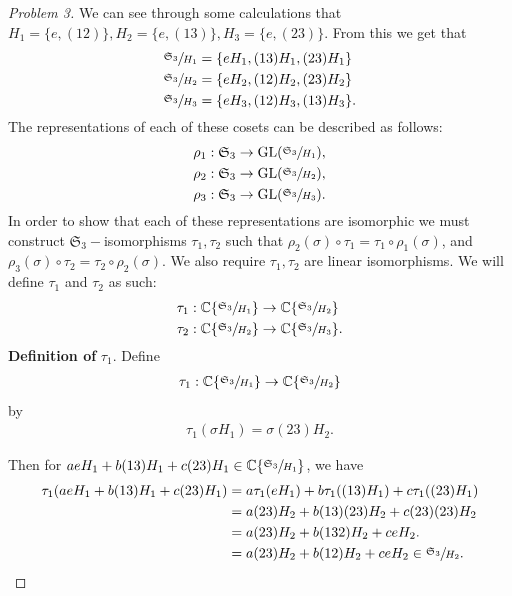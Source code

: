 \documentclass[titlepage]{article}
\theoremstyle{plain}
\theoremstyle{definition}
\theoremstyle{remark}
\theoremstyle{exercise-style}
\numberwithin{equation}{section}
\numberwithin{theorem}{section}
\numberwithin{remark}{section}
\begin{document}
\begin{proof}[Problem 3]
    We can see through some calculations that $H_1 = \{ e, (12) \}, H_2 = \{ e ,(13) \}, H_3 = \{ e, (23) \}$. From this we get that
    \begin{align}
        \sfrac{\mathfrak{S}_3}{H_1} &= \{ eH_1, (13)H_1, (23)H_1 \} \\
        \sfrac{\mathfrak{S}_3}{H_2} &= \{ eH_2, (12)H_2, (23)H_2 \} \\
        \sfrac{\mathfrak{S}_3}{H_3} &= \{ eH_3, (12)H_3, (13)H_3 \}.
    \end{align}
    The representations of each of these cosets can be described as follows:
    \begin{align}
        \rho_1 : \mathfrak{S}_3 &\to \mathrm{GL}(\sfrac{\mathfrak{S}_3}{H_1}), \\
        \rho_2 : \mathfrak{S}_3 &\to \mathrm{GL}(\sfrac{\mathfrak{S}_3}{H_2}), \\
        \rho_3 : \mathfrak{S}_3 &\to \mathrm{GL}(\sfrac{\mathfrak{S}_3}{H_3}).
    \end{align}
    In order to show that each of these representations are isomorphic we must construct $\mathfrak{S}_3-$isomorphisms $\tau_1, \tau_2$ such that $\rho_2(\sigma)\circ \tau_1 = \tau_1 \circ \rho_1(\sigma)$, and $\rho_3(\sigma) \circ \tau_2 = \tau_2 \circ \rho_2(\sigma)$. We also require $\tau_1, \tau_2$ are linear isomorphisms.
    We will define $\tau_1$ and $\tau_2$ as such:
    \begin{align}
        \tau_1: \mathbb{C}\{ \sfrac{\mathfrak{S}_3}{H_1} \} &\to \mathbb{C} \{ \sfrac{\mathfrak{S}_3}{H_2} \} \\
        \tau_2 : \mathbb{C}\{ \sfrac{\mathfrak{S}_3}{H_2} \}&\to \mathbb{C}\{ \sfrac{\mathfrak{S}_3}{H_3} \}.
    \end{align}
    \textbf{Definition of } $\tau_1$.
    Define
    \begin{align}
        \tau_1 : \mathbb{C}\{ \sfrac{\mathfrak{S}_3}{H_1} \} \to \mathbb{C}\{ \sfrac{\mathfrak{S}_3}{H_2} \}
    \end{align}
    by
    \begin{align}
        \tau_1(\sigma H_1) = \sigma (23)H_2.
    \end{align}
    
    Then for $a eH_1 + b(13)H_1 + c(23)H_1 \in \mathbb{C}\{ \sfrac{\mathfrak{S}_3}{H_1} \}$, we have
    \begin{align}
        \tau_1(a eH_1 + b(13)H_1 + c(23)H_1)
        &= a\tau_1(eH_1) + b\tau_1((13)H_1) + c\tau_1((23)H_1) \\
        &= a(23)H_2 + b(13)(23)H_2 + c(23)(23)H_2 \\
        &= a(23)H_2 + b(132)H_2 + c eH_2. \\
        &= a(23)H_2 + b(12)H_2 + c eH_2 \in \sfrac{\mathfrak{S}_3}{H_2}.
    \end{align}
    

\end{proof}
\end{document}
